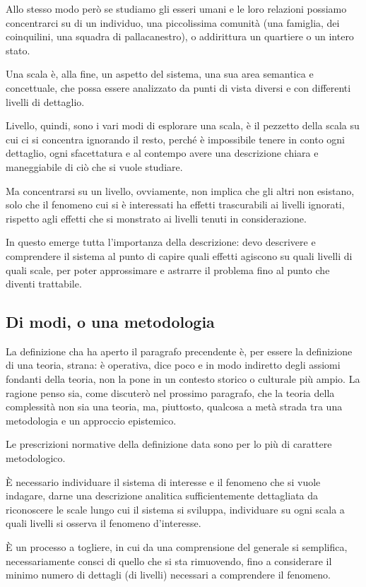 \documentclass[a4paper, headings=standardclasses]{scrartcl}
\begin{document}
Allo stesso modo però se studiamo gli esseri umani e le loro relazioni possiamo concentrarci su di un individuo, una piccolissima comunità (una famiglia, dei coinquilini, una squadra di pallacanestro), o addirittura un quartiere o un intero stato.

Una scala è, alla fine, un aspetto del sistema, una sua area semantica e concettuale, che possa essere analizzato da punti di vista diversi e con differenti livelli di dettaglio.

Livello, quindi, sono i vari modi di esplorare una scala, è il pezzetto della scala su cui ci si concentra ignorando il resto, perché è impossibile tenere in conto ogni dettaglio, ogni sfacettatura e al contempo avere una descrizione chiara e maneggiabile di ciò che si vuole studiare.

Ma concentrarsi su un livello, ovviamente, non implica che gli altri non esistano, solo che il fenomeno cui si è interessati ha effetti trascurabili ai livelli ignorati, rispetto agli effetti che si monstrato ai livelli tenuti in considerazione.

In questo emerge tutta l'importanza della descrizione: devo descrivere e comprendere il sistema al punto di capire quali effetti agiscono su quali livelli di quali scale, per poter approssimare e astrarre il problema fino al punto che diventi trattabile.

\subsection{Di modi, o una metodologia}
La definizione cha ha aperto il paragrafo precendente è, per essere la definizione di una teoria, strana: è operativa, dice poco e in modo indiretto degli assiomi fondanti della teoria, non la pone in un contesto storico o culturale più ampio.
La ragione penso sia, come discuterò nel prossimo paragrafo, che la teoria della complessità non sia una teoria, ma, piuttosto, qualcosa a metà strada tra una metodologia e un approccio epistemico.

Le prescrizioni normative della definizione data sono per lo più di carattere metodologico.

È necessario individuare il sistema di interesse e il fenomeno che si vuole indagare, darne una descrizione analitica sufficientemente dettagliata da riconoscere le scale lungo cui il sistema si sviluppa, individuare su ogni scala a quali livelli si osserva il fenomeno d'interesse.

È un processo a togliere, in cui da una comprensione del generale si semplifica, necessariamente consci di quello che si sta rimuovendo, fino a considerare il minimo numero di dettagli (di livelli) necessari a comprendere il fenomeno.
\end{document}
